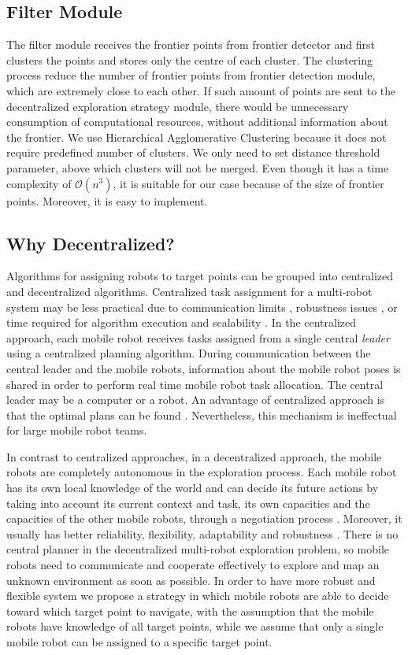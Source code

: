 \subsection{Filter Module}

The filter module receives the frontier points from frontier detector  and first clusters the points and stores only the centre of each cluster. The clustering process reduce the number of frontier points from frontier detection module, which are extremely close to each other. If such amount of points are sent to the decentralized exploration strategy module, there would be unnecessary consumption of computational resources, without additional information about the frontier. We use Hierarchical Agglomerative Clustering \cite{clutering} because it does not require predefined number of clusters. We only need to set distance threshold parameter, above which clusters will not be merged. Even though it has a time complexity of ${\displaystyle {\mathcal {O}}(n^{3})}$, it is suitable for our case because of the size of frontier points. Moreover, it is easy to implement. 

\subsection{Why Decentralized?}

Algorithms for assigning robots to target points can be grouped into centralized and decentralized algorithms. Centralized task assignment for a multi-robot system may be less practical due to communication limits \cite{Dias2000}, robustness issues \cite{Dias2006}, or time required for algorithm execution and scalability \cite{Julia2012}. In the centralized approach, each mobile robot receives tasks assigned from a single central \emph{leader} using a centralized planning algorithm. During communication between the central leader and the mobile robots, information about the mobile robot poses is shared in order to perform real time mobile robot task allocation. The central leader may be a computer or a robot. An advantage of centralized approach is that the optimal plans can be found \cite{Yan2011}. Nevertheless, this mechanism is ineffectual for large mobile robot teams.

In contrast to centralized approaches, in a decentralized approach, the mobile robots are completely autonomous in the exploration process. Each mobile robot has its own local knowledge of the world and can decide its future actions by taking into account its current context and task, its own capacities and the capacities of the other mobile robots, through a negotiation process \cite{Yan2013}. Moreover, it usually has better reliability, flexibility, adaptability and robustness \cite{Zlot2002}. There is no central planner in the decentralized multi-robot exploration problem, so mobile robots need to communicate and cooperate effectively to explore and map an unknown environment as soon as possible. 
In order to have more robust and flexible system we propose a strategy in which mobile robots are able to decide toward which target point to navigate, with the assumption that the mobile robots have knowledge of all target points, while we assume that only a single mobile robot can be assigned to a specific target point.  


